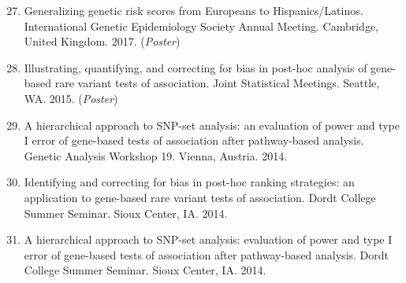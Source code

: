 \documentclass[margin]{res}
\newenvironment{benumerate}[1]{
    \let\oldItem\item
    \def\item{\addtocounter{enumi}{-2}\oldItem}
    
    \begin{enumerate}
    \setcounter{enumi}{#1}
    \addtocounter{enumi}{1}
}{
    \end{enumerate}
}
\begin{document}
\begin{resume}
\begin{benumerate}{26}
\item %
Generalizing genetic risk scores from Europeans to Hispanics/Latinos. International Genetic Epidemiology Society Annual Meeting. Cambridge, United Kingdom. 2017. (\textit{Poster})





\item %
Illustrating, quantifying, and correcting for bias in post-hoc analysis of gene-based rare variant tests of association. Joint Statistical Meetings. Seattle, WA. 2015. (\textit{Poster})


\item %
A hierarchical approach to SNP-set analysis: an evaluation of power and type I error of gene-based tests of association after pathway-based analysis. Genetic Analysis Workshop 19. Vienna, Austria. 2014.

\item %
Identifying and correcting for bias in post-hoc ranking strategies: an application to gene-based rare variant tests of association. Dordt College Summer Seminar. Sioux Center, IA. 2014.

\item %
A hierarchical approach to SNP-set analysis: evaluation of power and type I error of gene-based tests of association after pathway-based analysis. Dordt College Summer Seminar. Sioux Center, IA. 2014.


\end{benumerate}
\end{resume}
\end{document}
